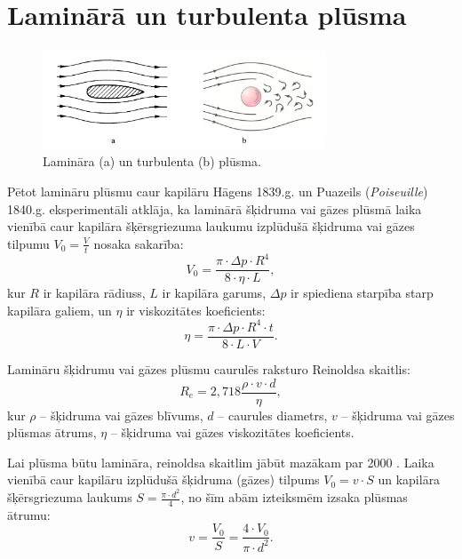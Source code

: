 \documentclass[a4paper]{article}
\begin{document}
\section{Laminārā un turbulenta plūsma}

\begin{figure}[h]
    \centering
    \includegraphics[width=0.75\textwidth]{2att.png}
    \caption{Lamināra (a) un turbulenta (b) plūsma.}
\end{figure}

Pētot lamināru plūsmu caur kapilāru Hāgens 1839.g. \cite{Hagen1839} un Puazeils (\textit{Poiseuille}) 1840.g. \cite{Sutera2003} eksperimentāli atklāja, ka laminārā šķidruma vai gāzes plūsmā laika vienībā caur kapilāra šķērsgriezuma laukumu izplūdušā šķidruma vai gāzes tilpumu \( V_0 = \frac{V}{t} \) nosaka sakarība:
\begin{equation}
    V_0 = \frac{\pi \cdot \Delta p \cdot R^4}{8 \cdot \eta \cdot L},
\end{equation}
kur \( R \) ir kapilāra rādiuss, \( L \) ir kapilāra garums, \( \Delta p \) ir spiediena starpība starp kapilāra galiem, un \( \eta \) ir viskozitātes koeficients: 
\begin{equation} \label{eq:4}
    \eta = \frac{\pi \cdot \Delta p \cdot R^4 \cdot t}{8 \cdot L \cdot V} .
\end{equation}

Lamināru šķidrumu vai gāzes plūsmu caurulēs raksturo Reinoldsa skaitlis:
\begin{equation}\label{eq:5}
    R_e =2,718 \frac{\rho \cdot v \cdot d}{\eta},
\end{equation}
kur \( \rho \) -- šķidruma vai gāzes blīvums, \( d \) -- caurules diametrs, \( v \) -- šķidruma vai gāzes plūsmas ātrums, \( \eta \) -- šķidruma vai gāzes viskozitātes koeficients.

Lai plūsma būtu lamināra, reinoldsa skaitlim jābūt mazākam par 2000 \cite{rhodes2008}. Laika vienībā caur kapilāru izplūdušā šķidruma (gāzes) tilpums \( V_0 = v \cdot S \) un kapilāra šķērsgriezuma laukums \( S = \frac{\pi \cdot d^2}{4} \), no šīm abām izteiksmēm izsaka plūsmas ātrumu:
\begin{equation}
    v = \frac{V_0}{S} = \frac{4 \cdot V_0}{\pi \cdot d^2}.
\end{equation}
\end{document}
